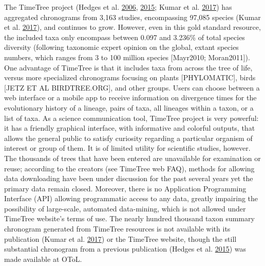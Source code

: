 \documentclass[]{article}
\begin{document}
The TimeTree project (Hedges et al. \protect\hyperlink{ref-Hedges2006}{2006}, \protect\hyperlink{ref-Hedges2015}{2015}; Kumar et al. \protect\hyperlink{ref-Kumar2017}{2017}) has aggregated chronograms
from 3,163 studies, encompassing 97,085 species (Kumar et al. \protect\hyperlink{ref-Kumar2017}{2017}), and continues to grow.
However, even in this gold standard resource, the included taxa only encompass between
0.097 and 3.236\% of total species diversity (following taxonomic expert opinion
on the global, extant species numbers, which ranges from 3 to 100 million species
{[}Mayr2010; Moran2011{]}). One advantage of TimeTree is that it includes taxa from
across the tree of life, versus more specialized chronograms focusing on plants
{[}PHYLOMATIC{]}, birds {[}JETZ ET AL BIRDTREE.ORG{]}, and other groups. Users can choose
between a web interface or a mobile app to receive information on divergence times
for the evolutionary history of a lineage, pairs of taxa, all lineages within a
taxon, or a list of taxa. As a science communication tool, TimeTree project is
very powerful: it has a friendly graphical interface, with informative and colorful
outputs, that allows the general public to satisfy curiosity regarding a particular
organism of interest or group of them. It is of limited utility for scientific
studies, however. The thousands of trees that have been entered are unavailable
for examination or reuse; according to the creators (see TimeTree web FAQ), methods
for allowing data downloading have been under discussion for the past several years
yet the primary data remain closed. Moreover, there is no Application Programming
Interface (API) allowing programmatic access to any data, greatly impairing the
possibility of large-scale, automated data-mining, which is not allowed under TimeTree
website's terms of use. The nearly hundred thousand taxon summary chronogram generated
from TimeTree resources is not available with its publication (Kumar et al. \protect\hyperlink{ref-Kumar2017}{2017}) or the
TimeTree website, though the still substantial chronogram from a previous publication
(Hedges et al. \protect\hyperlink{ref-Hedges2015}{2015}) was made available at OToL.
\end{document}
